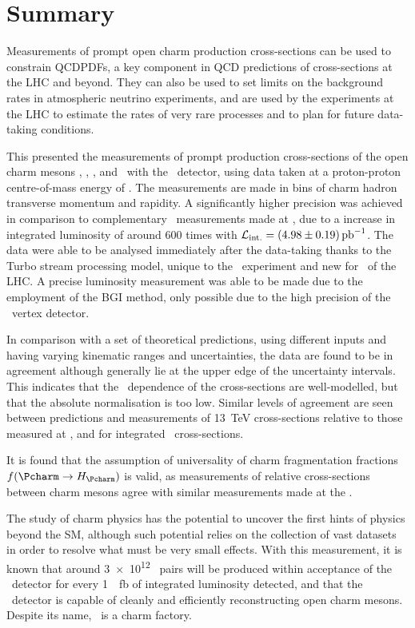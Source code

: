 \chapter{Summary}
\label{chap:prod:summary}

Measurements of prompt open charm production cross-sections can be used to 
constrain \aclp{QCDPDF}, a key component in \ac{QCD} predictions of 
cross-sections at the \ac{LHC} and beyond.
They can also be used to set limits on the background rates in atmospheric 
neutrino experiments, and are used by the experiments at the \ac{LHC} to 
estimate the rates of very rare processes and to plan for future data-taking 
conditions.

This  presented the measurements of prompt production 
cross-sections of the open charm mesons \PDzero, \PDplus, \PDsplus, and 
\PDstarp\ with the \lhcb\ detector, using data taken at a proton-proton 
centre-of-mass energy of .
The measurements are made in bins of charm hadron transverse momentum and 
rapidity.
A significantly higher precision was achieved in comparison to complementary 
\lhcb\ measurements made at , due to a increase in integrated 
luminosity of around 600 times with $\intlumi = 
\SI{\xsectotlumi}{\per\pico\barn}$.
The data were able to be analysed immediately after the data-taking thanks to 
the Turbo stream processing model, unique to the \lhcb\ experiment and new for 
\runtwo\ of the \ac{LHC}.
A precise luminosity measurement was able to be made due to the employment of 
the \acl{BGI} method, only possible due to the high precision of the \lhcb\ 
vertex detector.

In comparison with a set of theoretical predictions, using different inputs and 
having varying kinematic ranges and uncertainties, the data are found to be in 
agreement although generally lie at the upper edge of the uncertainty 
intervals.
This indicates that the \pTy\ dependence of the cross-sections are 
well-modelled, but that the absolute normalisation is too low.
Similar levels of agreement are seen between predictions and measurements of 
\SI{13}{\TeV} cross-sections relative to those measured at \sqrtseq{7}, and for 
integrated \ccbar\ cross-sections.

It is found that the assumption of universality of charm fragmentation 
fractions $f(\cToHc)$ is valid, as measurements of relative cross-sections 
between charm mesons agree with similar measurements made at the \bfactories.

The study of charm physics has the potential to uncover the first hints of 
physics beyond the \ac{SM}, although such potential relies on the collection of 
vast datasets in order to resolve what must be very small effects.
With this measurement, it is known that around \num{3e12} \ccbar\ pairs will be 
produced within acceptance of the \lhcb\ detector for every 
\SI{1}{\per\femto\barn} of integrated luminosity detected, and that the \lhcb\ 
detector is capable of cleanly and efficiently reconstructing open charm 
mesons.
Despite its name, \lhcb\ is a charm factory.
